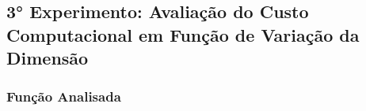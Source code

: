 \subsection{3° Experimento: Avaliação do Custo Computacional em Função de Variação da Dimensão}
    \subsubsection{Função Analisada}